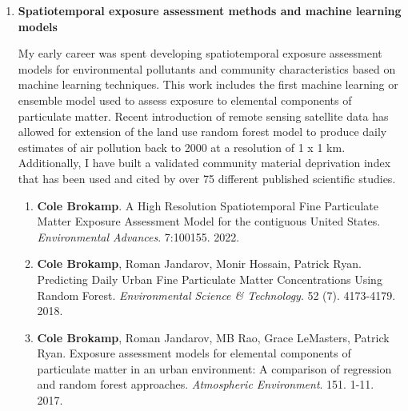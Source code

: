 \documentclass{nihbiosketch}
\begin{document}
\begin{enumerate}

\item \textbf{Spatiotemporal exposure assessment methods and machine learning models}

  My early career was spent developing spatiotemporal exposure assessment models for
  environmental pollutants and community characteristics based on machine learning
  techniques.  This work includes the first machine
  learning or ensemble model used to assess exposure to elemental components of
  particulate matter. Recent introduction of remote sensing satellite data has
  allowed for extension of the land use random forest model to produce daily
  estimates of air pollution back to 2000 at a resolution of 1 x 1 km. Additionally,
  I have built a validated community material deprivation index that has been used and cited
  by over 75 different published scientific studies.

\begin{enumerate}

  \item \textbf{Cole Brokamp}. A High Resolution Spatiotemporal Fine Particulate Matter Exposure Assessment Model for the contiguous United States. \textit{Environmental Advances}. 7:100155. 2022.

  \item \textbf{Cole Brokamp}, Roman Jandarov, Monir Hossain, Patrick Ryan. Predicting Daily Urban Fine Particulate Matter Concentrations Using Random Forest. \textit{Environmental Science \& Technology}. 52 (7). 4173-4179. 2018.

  \item \textbf{Cole Brokamp}, Roman Jandarov, MB Rao, Grace LeMasters, Patrick Ryan. Exposure assessment models for elemental components of particulate matter in an urban environment: A comparison of regression and random forest approaches. \textit{Atmospheric Environment}. 151. 1-11. 2017.




\end{enumerate}
\end{enumerate}
\end{document}
